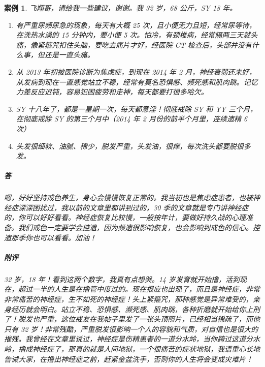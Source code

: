 \documentclass{ctexart}
\newtheorem{case}{案例}
\begin{document}
\begin{case}
    飞翔哥，请给我一些建议，谢谢。我 32 岁，68 公斤，SY 18 年。\begin{enumerate}
        \item 有严重尿频尿急的现象，每天有大概 25 次，且小便无力且短，经常尿等待，在洗热水澡的 15 分钟内，要小便 5 次。怕冷，有颈椎病，经常隔两三天就头痛，像紧箍咒扣住头脑，要吃去痛片才好，经医院 CT 检查后，头部并没有什么事，但还是一直头痛。
        \item 从 2013 年初被医院诊断为焦虑症，到现在 2014 年 2 月，神经衰弱还未好，从发病到现在一直感觉站立不稳，经常有莫名恐惧感、频死感和肌肉跳。记忆力差反应迟钝，容易犯困疲劳和走神，每天都要打很多哈欠。
        \item SY 十八年了，都是一星期一次，每天都意淫！彻底戒除 SY 和 YY 三个月，在彻底戒除 SY 的第三个月中（2014 年 2 月份的前半个月里，连续遗精 6 次）
        \item 头发很细软、油腻、稀少，脱发严重，头发油，很痒，每次洗头都要脱很多发。
    \end{enumerate}
    \subparagraph{答} 嗯，好好坚持戒色养生，身心会慢慢恢复正常的。我当初也是焦虑症患者，也被神经症深深困扰过，我以前的文章里都讲到过的，30 季的文章就是专门讲神经症的，你可以好好看看。神经症恢复比较慢，一般按年计，要做好持久战的心理准备。我们戒色一定要学会控遗，因为频遗很影响恢复，也会影响到戒色的信心。控遗那季你也可以看看。加油！
    \subparagraph{附评} 32 岁，18 年！看到这两个数字，我真有点想哭。14 岁发育就开始撸，活到现在，超过一半的人生是在撸管中度过的。现在报应也出现了，而且是神经症，非常非常痛苦的神经症，生不如死的神经症！头上紧箍咒，那种感觉是异常难受的，亲身经历就会明白。站立不稳、恐惧感、濒死感、肌肉跳，各种折磨就开始给你上刑了！脱发也严重，这位戒友在我帖子里发了一张头顶照片，已经相当稀疏了，而他只有 32 岁！非常残酷，严重脱发很影响一个人的容貌和气质，对自信也是很大的摧残。我曾经在文章里说过，神经症是伤精患者的一道分水岭，当你跨过这道分水岭，撸成神经症了，那真的就是人间地狱，一个很痛苦的症状地狱，我语重心长地告诫大家，在撸出神经症之前，赶紧金盆洗手，否则你的人生将会变成灾难片！
\end{case}
\end{document}
